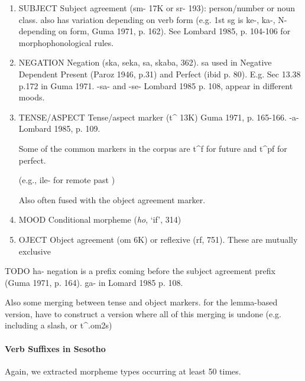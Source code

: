 \begin{enumerate}
    \item SUBJECT Subject agreement (sm- 17K or sr- 193): person/number or noun class. also has variation depending on verb form (e.g. 1st sg is ke-, ka-, N- depending on form, Guma 1971, p. 162). See Lombard 1985, p. 104-106 for morphophonological rules.
    
    \cite[]{doke1967textbook}
    
    \item NEGATION Negation (ska, seka, sa, skaba, 362). sa used in Negative Dependent Present (Paroz 1946, p.31) and Perfect (ibid p. 80). E.g. Sec 13.38 p.172 in Guma 1971. -sa- and -se- Lombard 1985 p. 108, appear in different moods.
    
    \item TENSE/ASPECT Tense/aspect marker (t\^{} 13K) Guma 1971, p. 165-166. -a- Lombard 1985, p. 109.
    
    Some of the common markers in the corpus are t\^{}f for future and t\^{}pf for perfect.
    
    (e.g., ile- for remote past \cite[]{doke1967textbook})
    
    Also often fused with the object agreement marker.
    
    \item MOOD Conditional morpheme (\emph{ho}, `if', 314)
    
    \item OJECT Object agreement (om 6K) or reflexive (rf, 751). These are mutually exclusive \cite[p. 165]{guma1971handbook}
\end{enumerate}


TODO ha- negation is a prefix coming before the subject agreement prefix (Guma 1971, p. 164).  ga- in Lomard 1985 p. 108.



Also some merging between tense and object markers. for the lemma-based version, have to construct a version where all of this merging is undone (e.g. including a slash, or t\^{}.om2s)


\paragraph{Verb Suffixes in Sesotho}

Again, we extracted morpheme types occurring at least 50 times.

